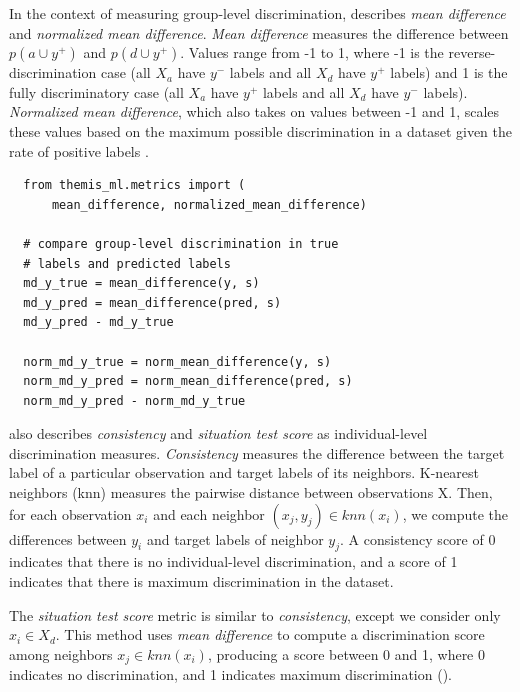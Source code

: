 \documentclass[man,natbib]{apa6}
\begin{document}
In the context of measuring group-level discrimination,
\cite{zliobaite2015survey} describes \emph{mean difference} and \emph{normalized
mean difference}. \emph{Mean difference} measures the difference between \(p(a
\cup y^{+})\) and \(p(d \cup y^{+})\). Values range from -1 to 1, where -1 is
the reverse-discrimination case (all \(X_a\) have \(y^{-}\) labels and all
\(X_d\) have \(y^{+}\) labels) and 1 is the fully discriminatory case
(all \(X_a\) have \(y^{+}\) labels and all \(X_d\) have \(y^{-}\) labels).
\emph{Normalized mean difference}, which also takes on values between -1 and 1,
scales these values based on the maximum possible discrimination in a dataset
given the rate of positive labels \cite{zliobaite2015survey}.

\begin{verbatim}
  from themis_ml.metrics import (
      mean_difference, normalized_mean_difference)

  # compare group-level discrimination in true
  # labels and predicted labels
  md_y_true = mean_difference(y, s)
  md_y_pred = mean_difference(pred, s)
  md_y_pred - md_y_true

  norm_md_y_true = norm_mean_difference(y, s)
  norm_md_y_pred = norm_mean_difference(pred, s)
  norm_md_y_pred - norm_md_y_true
\end{verbatim}

\cite{zliobaite2015survey} also describes \emph{consistency} and \emph{situation
test score} as individual-level discrimination measures. \emph{Consistency}
measures the difference between the target label of a particular observation and
target labels of its neighbors. K-nearest neighbors (knn) measures the pairwise
distance between observations X. Then, for each observation \(x_i\) and each
neighbor \((x_j, y_j) \in knn(x_i)\), we compute the differences between \(y_i\)
and target labels of neighbor \(y_j\). A consistency score of 0 indicates that
there is no individual-level discrimination, and a score of 1 indicates that
there is maximum discrimination in the dataset.

The \emph{situation test score} metric is similar to \emph{consistency}, except
we consider only \(x_i \in X_d\). This method uses \emph{mean difference} to
compute a discrimination score among neighbors \(x_j \in knn(x_i)\), producing a
score between 0 and 1, where 0 indicates no discrimination, and 1 indicates
maximum discrimination (\citealp{zliobaite2015survey}).
\end{document}
